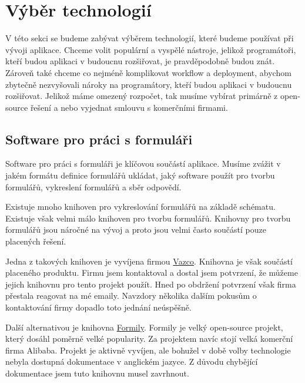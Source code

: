 \section{Výběr technologií}\label{sec:vyber-technologii}

V této sekci se budeme zabývat výběrem technologií, které budeme používat při vývoji aplikace.
Chceme volit populární a vyspělé nástroje, jelikož programátoři, kteří budou aplikaci v budoucnu rozšiřovat, je pravděpodobně budou znát.
Zároveň také chceme co nejméně komplikovat workflow a deployment, abychom zbytečně nezvyšovali nároky na programátory, kteří budou aplikaci v budoucnu rozšiřovat.
Jelikož máme omezený rozpočet, tak musíme vybírat primárně z open-source řešení a nebo vyjednat smlouvu s komerčními firmami.

\subsection{Software pro práci s formuláři}\label{subsec:software-pro-praci-s-formulari}

Software pro práci s formuláři je klíčovou součástí aplikace.
Musíme zvážit v jakém formátu definice formulářů ukládat, jaký software použít pro tvorbu formulářů, vykreslení formulářů a sběr odpovědí.

Existuje mnoho knihoven pro vykreslování formulářů na základě schématu.
Existuje však velmi málo knihoven pro tvorbu formulářů.
Knihovny pro tvorbu formulářů jsou náročné na vývoj a proto jsou velmi často součástí pouze placených řešení.

Jedna z takových knihoven je vyvíjena firmou \href{https://www.vazco.eu/}{Vazco}.
Knihovna je však součástí placeného produktu.
Firmu jsem kontaktoval a dostal jsem potvrzení, že můžeme jejich knihovnu pro tento projekt použít.
Hned po obdržení potvrzení však firma přestala reagovat na mé emaily.
Navzdory několika dalším pokusům o kontaktování firmy dopadlo toto jednání neúspěšně.

Další alternativou je knihovna \href{https://formilyjs.org/}{Formily}.
Formily je velký open-source projekt, který dosáhl poměrně velké popularity.
Za projektem navíc stojí velká komerční firma Alibaba.
Projekt je aktivně vyvíjen, ale bohužel v době volby technologie nebyla dostupná dokumentace v anglickém jazyce.
Z důvodu chybějící dokumentace jsem tuto knihovnu musel zavrhnout.

